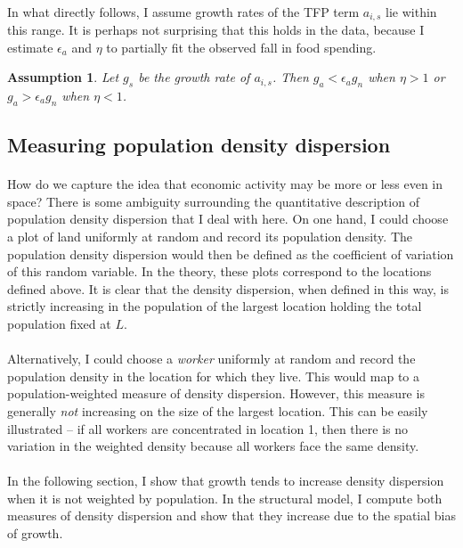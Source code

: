 \documentclass[]{article}
\theoremstyle{plain}
\newtheorem{assumption}{Assumption}
\begin{document}
\paragraph*{}
In what directly follows, I assume growth rates of the TFP term $a_{i, s}$ lie within this range. It is perhaps not surprising that this holds in the data, because I estimate $\epsilon_{a}$ and $\eta$ to partially fit the observed fall in food spending. 
\begin{assumption}\label{assump:growthrates}
Let $g_{s}$ be the growth rate of $a_{i,s}$. Then $g_{a} < \epsilon_{a}g_{n}$ when $\eta > 1$ or $g_{a} > \epsilon_{a}g_{n}$ when $\eta < 1$.
\end{assumption}

\subsection*{Measuring population density dispersion}
\paragraph*{}
 How do we capture the idea that economic activity may be more or less even in space? There is some ambiguity surrounding the quantitative description of population density dispersion that I deal with here. On one hand, I could choose a plot of land uniformly at random and record its population density. The population density dispersion would then be defined as the coefficient of variation of this random variable. In the theory, these plots correspond to the locations defined above. It is clear that the density dispersion, when defined in this way, is strictly increasing in the population of the largest location holding the total population fixed at $L$. 
 \paragraph*{}
 Alternatively, I could choose a \textit{worker} uniformly at random and record the population density in the location for which they live. This would map to a population-weighted measure of density dispersion. However, this measure is generally \textit{not} increasing on the size of the largest location. This can be easily illustrated -- if all workers are concentrated in location 1, then there is no variation in the weighted density because all workers face the same density.
 \paragraph*{}
 In the following section, I show that growth tends to increase density dispersion when it is not weighted by population. In the structural model, I compute both measures of density dispersion and show that they increase due to the spatial bias of growth. 
 
\end{document}

